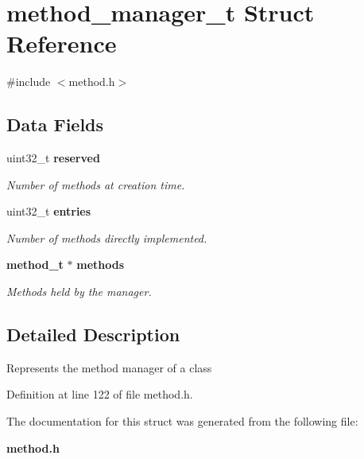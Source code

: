 \section{method\_\-manager\_\-t Struct Reference}
\label{structmethod__manager__t}


{\ttfamily \#include $<$method.h$>$}

\subsection*{Data Fields}
\begin{DoxyCompactItemize}
\item 
uint32\_\-t {\bf reserved}\label{structmethod__manager__t_abc20d5aef5d0a5d6777b05ca7c3553fa}

\begin{DoxyCompactList}\small\item\em Number of methods at creation time. \item\end{DoxyCompactList}\item 
uint32\_\-t {\bf entries}\label{structmethod__manager__t_a1d155d37d873eb51c6e596c05d70ce60}

\begin{DoxyCompactList}\small\item\em Number of methods directly implemented. \item\end{DoxyCompactList}\item 
{\bf method\_\-t} $\ast$ {\bf methods}\label{structmethod__manager__t_ab74dca6d08fb975c99bcf026b9ea3831}

\begin{DoxyCompactList}\small\item\em Methods held by the manager. \item\end{DoxyCompactList}\end{DoxyCompactItemize}


\subsection{Detailed Description}
Represents the method manager of a class 

Definition at line 122 of file method.h.



The documentation for this struct was generated from the following file:\begin{DoxyCompactItemize}
\item 
{\bf method.h}\end{DoxyCompactItemize}
